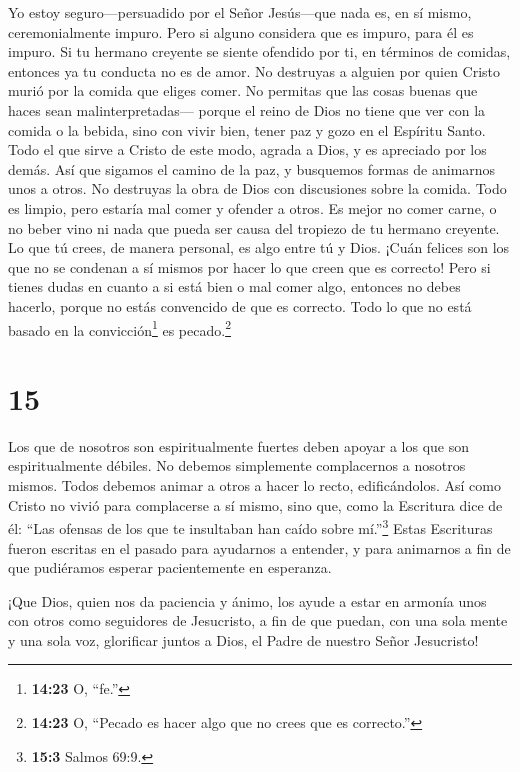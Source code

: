  Yo estoy seguro---persuadido por el Señor Jesús---que nada
es, en sí mismo, ceremonialmente impuro. Pero si alguno considera que es
impuro, para él es impuro.  Si tu hermano creyente se
siente ofendido por ti, en términos de comidas, entonces ya tu conducta
no es de amor. No destruyas a alguien por quien Cristo murió por la
comida que eliges comer.  No permitas que las cosas buenas
que haces sean malinterpretadas---  porque el reino de Dios
no tiene que ver con la comida o la bebida, sino con vivir bien, tener
paz y gozo en el Espíritu Santo.  Todo el que sirve a
Cristo de este modo, agrada a Dios, y es apreciado por los demás.
 Así que sigamos el camino de la paz, y busquemos formas de
animarnos unos a otros.  No destruyas la obra de Dios con
discusiones sobre la comida. Todo es limpio, pero estaría mal comer y
ofender a otros.  Es mejor no comer carne, o no beber vino
ni nada que pueda ser causa del tropiezo de tu hermano creyente.
 Lo que tú crees, de manera personal, es algo entre tú y
Dios. ¡Cuán felices son los que no se condenan a sí mismos por hacer lo
que creen que es correcto!  Pero si tienes dudas en cuanto
a si está bien o mal comer algo, entonces no debes hacerlo, porque no
estás convencido de que es correcto. Todo lo que no está basado en la
convicción\footnote{\textbf{14:23} O, ``fe.''} es pecado.\footnote{\textbf{14:23}
  O, ``Pecado es hacer algo que no crees que es correcto.''}

\hypertarget{section-14}{%
\section{15}\label{section-14}}

 Los que de nosotros son espiritualmente fuertes deben
apoyar a los que son espiritualmente débiles. No debemos simplemente
complacernos a nosotros mismos.  Todos debemos animar a
otros a hacer lo recto, edificándolos.  Así como Cristo no
vivió para complacerse a sí mismo, sino que, como la Escritura dice de
él: ``Las ofensas de los que te insultaban han caído sobre
mí.''\footnote{\textbf{15:3} Salmos 69:9.}  Estas Escrituras
fueron escritas en el pasado para ayudarnos a entender, y para animarnos
a fin de que pudiéramos esperar pacientemente en esperanza.

 ¡Que Dios, quien nos da paciencia y ánimo, los ayude a
estar en armonía unos con otros como seguidores de Jesucristo,
 a fin de que puedan, con una sola mente y una sola voz,
glorificar juntos a Dios, el Padre de nuestro Señor Jesucristo!

